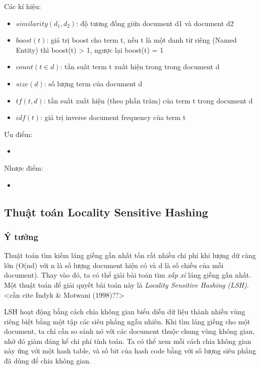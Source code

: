 	Các kí hiệu: 
	\begin{itemize}
		\item $similarity(d_1, d_2)$: độ tương đồng giữa document d1 và document d2
		\item $boost(t)$: giá trị boost cho term t, nếu t là một danh từ riêng (Named Entity) thì boost(t) > 1, ngược lại boost(t) = 1
		\item $count(t \in d)$: tần suất term t xuất hiện trong trong document d
		\item $size(d)$: số lượng term của document d
		\item $tf(t, d)$: tần suất xuất hiện (theo phần trăm) của term t trong document d
		\item $idf(t)$: giá trị inverse document frequency của term t
	\end{itemize}
	
	Ưu điểm:
	\begin{itemize}
		\item 
	\end{itemize}
	Nhược điểm:
	\begin{itemize}
		\item 
	\end{itemize}
	

\subsection{Thuật toán Locality Sensitive Hashing}
	\subsubsection{Ý tưởng}
	Thuật toán tìm kiếm láng giềng gần nhất tốn rất nhiều chi phí khi lượng dữ càng lớn (O(nd) với n là số lượng document hiện có và d là số chiều của mỗi document). Thay vào đó, ta có thể giải bài toán tìm \textit{xấp xỉ} láng giềng gần nhất. Một thuật toán để giải quyết bài toán này là \textit{Locality Sensitive Hashing (LSH)}. <cần cite Indyk \& Motwani (1998)??>
	
	LSH hoạt động bằng cách chia không gian biểu diễn dữ liệu thành nhiều vùng riêng biệt bằng một tập các siêu phẳng ngẫu nhiên. Khi tìm láng giềng cho một document, ta chỉ cần so sánh nó với các document thuộc chung vùng không gian, nhờ đó giảm đáng kể chi phí tính toán. Ta có thể xem mỗi cách chia không gian này ứng với một hash table, và số bit của hash code bằng với số lượng siêu phẳng đã dùng để chia không gian.
	
